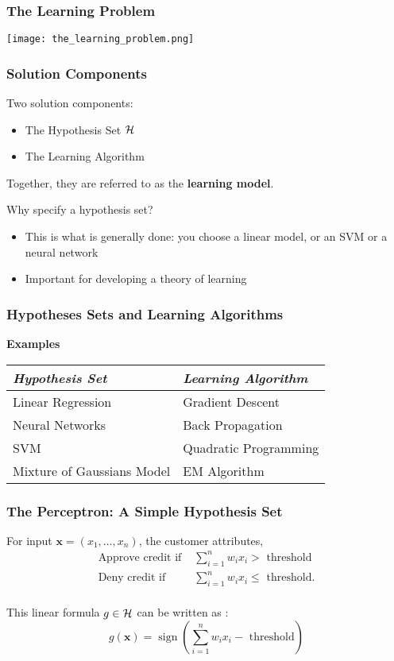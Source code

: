 \documentclass[xcolor=table]{beamer}
\newcommand{\vect}[1]{\ensuremath{\mathbf{#1}}}
\DeclareMathOperator{\sign}{sign}
\begin{document}
\begin{frame}[t]
\frametitle{The Learning Problem}
\begin{center}
\texttt{[image: the\_learning\_problem.png]}
\end{center}
\end{frame}

\begin{frame}[t]
\frametitle{Solution Components}
Two solution components:
\begin{itemize}
    \item The Hypothesis Set $\cal{H}$
    \item The Learning Algorithm
\end{itemize}

Together, they are referred to as the \textbf{learning model}.

\pause

\bigskip

Why specify a hypothesis set?
\begin{itemize}
    \item This is what is generally done: you choose a linear model, 
    or an SVM or a neural network

    \item Important for developing a theory of learning 
\end{itemize}
\end{frame}

\begin{frame}[t]
\frametitle{Hypotheses Sets and Learning Algorithms}
\textbf{Examples}

\begin{center}
\begin{tabular}{ll}
\emph{Hypothesis Set} & \emph{Learning Algorithm} \\ \hline
Linear Regression & Gradient Descent \\
Neural Networks & Back Propagation \\
SVM & Quadratic Programming \\
Mixture of Gaussians Model & EM Algorithm \\
\end{tabular}
\end{center}
\end{frame}

\begin{frame}[t]
\frametitle{The Perceptron: A Simple Hypothesis Set}
For input $\vect{x} = (x_1, \ldots, x_n)$, the customer attributes,
\begin{align*}
\text{Approve credit if } & \sum_{i = 1}^{n} w_i x_i >    \text{ threshold} \\
\text{Deny credit if }    & \sum_{i = 1}^{n} w_i x_i \leq \text{ threshold}. \\
\end{align*}

This linear formula $g \in \cal{H}$ can be written as :
\[
    g(\vect{x}) = \sign \left (\sum_{i=1}^{n} w_i x_i - \text{ threshold} \right )
\]
\end{frame}
\end{document}
